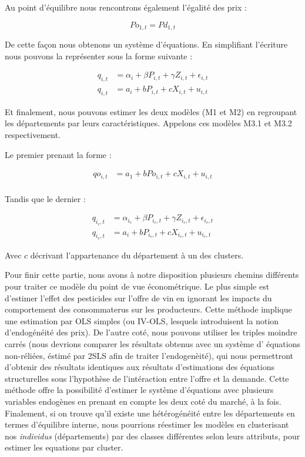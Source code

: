 \documentclass[11pt,]{article}
\begin{document}
Au point d'équilibre nous rencontrons également l'égalité des prix :

\begin{equation*}
  Po_{1,t} = Pd_{1,t}
\end{equation*}

De cette façon nous obtenons un système d'équations. En simplifiant
l'écriture nous pouvons la représenter sous la forme suivante :

\begin{align*}
  q_{i,t} & = \alpha_{i} + \beta P_{i,t} + \gamma Z_{i,t} + \epsilon_{i,t} \\
  q_{i,t} & = a_i + b P_{i,t} + c X_{i,t} + u_{i,t}
\end{align*}

Et finalement, nous pouvons estimer les deux modèles (M1 et M2) en
regroupant les départements par leurs caractéristiques. Appelons ces
modèles M3.1 et M3.2 respectivement.

Le premier prenant la forme :

\begin{align*}
  qo_{i,t} & = a_1 + b Po_{i,t} + c X_{i,t} + u_{i,t} \\ 
\end{align*}

Tandis que le dernier :

\begin{align*}
  q_{i_{c},t} & = \alpha_{i_{c}} + \beta P_{i_{c},t} + \gamma Z_{i_{c},t} + \epsilon_{i_{c},t} \\
  q_{i_{c},t} & = a_i + b P_{i_{c},t} + c X_{i_{c},t} + u_{i_{c},t}
\end{align*}

Avec \(c\) décrivant l'appartenance du département à un des clusters.

Pour finir cette partie, nous avons à notre disposition plusieurs
chemins différents pour traiter ce modèle du point de vue économétrique.
Le plus simple est d'estimer l'effet des pesticides sur l'offre de vin
en ignorant les impacts du comportement des consommaterus sur les
producteurs. Cette méthode implique une estimation par OLS simples (ou
IV-OLS, lesquels introduisent la notion d'endogénéité des prix). De
l'autre coté, nous pouvons utiliser les triples moindre carrés (nous
devrions comparer les résultats obtenus avec un système d' équations
non-réliées, éstimé par 2SLS afin de traiter l'endogenèité), qui nous
permettront d'obtenir des résultats identiques aux résultats
d'estimations des équations structurelles sous l'hypothèse de
l'intéraction entre l'offre et la demande. Cette méthode offre la
possibilité d'estimer le système d'équations avec plusieurs variables
endogènes en prenant en compte les deux coté du marché, à la fois.
Finalement, si on trouve qu'il existe une hétérogénéité entre les
départements en termes d'équilibre interne, nous pourrions réestimer les
modèles en clusterisant nos \emph{individus} (départements) par des
classes différentes selon leurs attributs, pour estimer les equations
par cluster.
\end{document}
